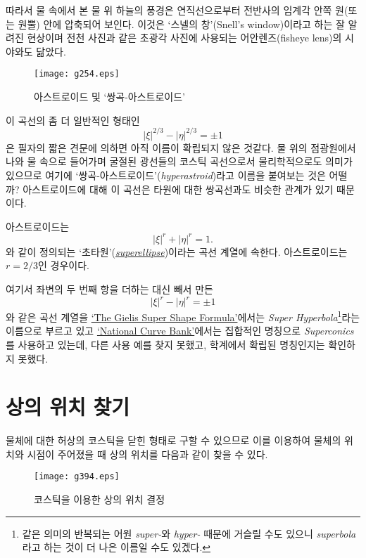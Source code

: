 \documentclass[twocolumn]{article}
\begin{document}
따라서 물 속에서 본 물 위 하늘의 풍경은
연직선으로부터 전반사의 임계각 안쪽 원(또는 원뿔) 안에 압축되어 보인다. 이것은 
`스넬의 창'(Snell's window)이라고 하는 잘 알려진 현상이며 전천 사진과 같은 초광각 
사진에 사용되는 어안렌즈(fisheye lens)의 시야와도 닮았다.

\begin{figure}
	\centering
	\texttt{[image: g254.eps]}
	\caption{아스트로이드 및 `쌍곡-아스트로이드'}
	\label{fig:hyperastroid}
\end{figure}

이 곡선의 좀 더 일반적인 형태인 
$$ \left| \xi \right|^{2/3} - \left| \eta \right|^{2/3} = \pm1 $$
은 필자의 짧은 견문에 의하면 아직 이름이 확립되지 않은 것같다. 물 위의 점광원에서 
나와 물 속으로 들어가며 굴절된 광선들의 코스틱 곡선으로서 물리학적으로도 의미가 있으므로 
여기에 `쌍곡-아스트로이드'(\emph{hyperastroid})라고 이름을 붙여보는 것은 어떨까?
아스트로이드에 대해 이 곡선은 타원에 대한 쌍곡선과도 비슷한 관계가 있기 때문이다. 
 
아스트로이드는 
$$ \left| \xi \right|^{r} + \left| \eta \right|^{r} = 1. $$
와 같이 정의되는 `초타원'(\href{https://mathworld.wolfram.com/Astroid.html}%
{\emph{superellipse}})이라는 곡선 계열에 속한다. 
아스트로이드는 $r=2/3$인 경우이다.

여기서 좌변의 두 번째 항을 더하는 대신 빼서 만든
$$ \left| \xi \right|^{r} - \left| \eta \right|^{r} = \pm 1 $$
와 같은 곡선 계열을 \href{http://dynamicmathematicslearning.com/super-ellipse.html}%
{`The Gielis Super Shape Formula'}에서는 \emph{Super Hyperbola}\footnote{같은 의미의 반복되는 어원
\emph{super-}와 \emph{hyper-} 때문에 거슬릴 수도 있으니 \emph{superbola}라고 하는 것이 
더 나은 이름일 수도 있겠다.}라는 이름으로 부르고 있고 
\href{https://old.nationalcurvebank.org/superconicncb/superconicncb.htm}{`National Curve Bank'}에서는
집합적인 명칭으로 \emph{Superconics}를 사용하고 있는데, 다른 사용 예를 찾지 못했고, 
학계에서 확립된 명칭인지는 확인하지 못했다.

\section{상의 위치 찾기}
물체에 대한 허상의 코스틱을 닫힌 형태로 구할 수 있으므로 이를 이용하여 물체의 위치와 
시점이 주어졌을 때 상의 위치를 다음과 같이 찾을 수 있다.

\begin{figure}
	\centering
	\texttt{[image: g394.eps]}
	\caption{코스틱을 이용한 상의 위치 결정}
	\label{fig:image_caustic}
\end{figure}
\end{document}
